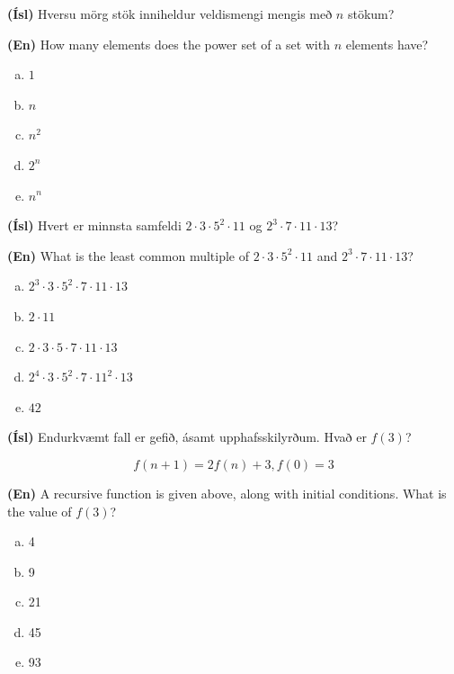 \documentclass[addpoints]{exam}
\begin{document}
\begin{questions}
\newpage

\question[3] 

\textbf{(Ísl)} Hversu mörg stök inniheldur veldismengi mengis með $n$ stökum?

\textbf{(En)} How many elements does the power set of a set with $n$ elements have?

\begin{enumerate}[a)]    
    \item $1$
    \item $n$
    \item $n^2$
    \item $2^n$ %
    \item $n^n$
\end{enumerate}

\question[3] 

\textbf{(Ísl)} Hvert er minnsta samfeldi $2\cdot 3 \cdot 5^2 \cdot 11$ og $2^3 \cdot 7 \cdot 11 \cdot 13$?

\textbf{(En)} What is the least common multiple of $2\cdot 3 \cdot 5^2 \cdot 11$ and $2^3 \cdot 7 \cdot 11 \cdot 13$?

\begin{enumerate}[a)]
    \item $2^3\cdot 3 \cdot 5^2 \cdot 7 \cdot 11 \cdot 13$ %
    \item $2\cdot 11$
    \item $2\cdot 3 \cdot 5 \cdot 7 \cdot 11 \cdot 13$
    \item $2^4\cdot 3 \cdot 5^2 \cdot 7 \cdot 11^2 \cdot 13$
    \item $42$
\end{enumerate}

\question[3]

\textbf{(Ísl)} Endurkvæmt fall er gefið, ásamt upphafsskilyrðum. Hvað er $f(3)$?

\[
    f(n+1) = 2f(n) + 3, f(0) = 3
\]

\textbf{(En)} A recursive function is given above, along with initial conditions. What is the value of $f(3)$?

\begin{enumerate}[a)]
    \item 4
    \item 9
    \item 21
    \item 45
    \item 93
\end{enumerate}

\newpage


\end{questions}
\end{document}
